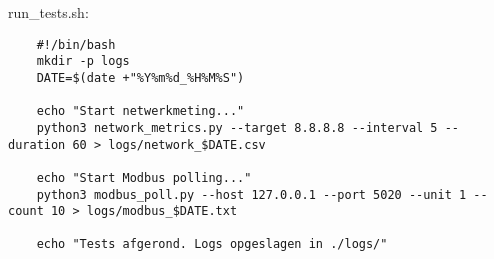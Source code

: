run\_tests.sh:

\begin{verbatim}
    #!/bin/bash
    mkdir -p logs
    DATE=$(date +"%Y%m%d_%H%M%S")
    
    echo "Start netwerkmeting..."
    python3 network_metrics.py --target 8.8.8.8 --interval 5 --duration 60 > logs/network_$DATE.csv
    
    echo "Start Modbus polling..."
    python3 modbus_poll.py --host 127.0.0.1 --port 5020 --unit 1 --count 10 > logs/modbus_$DATE.txt
    
    echo "Tests afgerond. Logs opgeslagen in ./logs/"
    
\end{verbatim}




